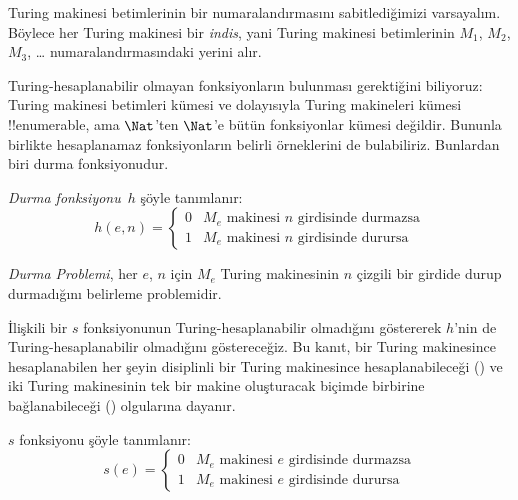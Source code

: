 \documentclass[../../../include/open-logic-section]{subfiles}
\begin{document}

\begin{explain}
Turing makinesi betimlerinin bir numaralandırmasını sabitlediğimizi
varsayalım. Böylece her Turing makinesi bir \emph{indis}, yani Turing
makinesi betimlerinin $M_1$, $M_2$, $M_3$, \dots{} numaralandırmasındaki
yerini alır.

Turing-hesaplanabilir olmayan fonksiyonların bulunması gerektiğini biliyoruz:
Turing makinesi betimleri kümesi ve dolayısıyla Turing makineleri kümesi
!!{enumerable}, ama $\Nat$'ten $\Nat$'e bütün fonksiyonlar kümesi değildir.
Bununla birlikte hesaplanamaz fonksiyonların belirli örneklerini de
bulabiliriz. Bunlardan biri durma fonksiyonudur.
\end{explain}

\begin{defn}
 \emph{Durma fonksiyonu}~$h$ şöyle tanımlanır:
\[
h(e,n) =
\begin{cases}
  \text{0} & \text{$M_e$ makinesi $n$ girdisinde durmazsa} \\
  \text{1} & \text{$M_e$ makinesi $n$ girdisinde durursa}
\end{cases}
\]
\end{defn}

\begin{defn}
\emph{Durma Problemi}, her $e$, $n$ için $M_e$ Turing makinesinin $n$ çizgili
bir girdide durup durmadığını belirleme problemidir.
\end{defn}

\begin{explain}
İlişkili bir $s$ fonksiyonunun Turing-hesaplanabilir olmadığını göstererek
$h$'nin de Turing-hesaplanabilir olmadığını göstereceğiz. Bu kanıt, bir
Turing makinesince hesaplanabilen her şeyin disiplinli bir Turing makinesince
hesaplanabileceği () ve iki Turing makinesinin tek bir
makine oluşturacak biçimde birbirine bağlanabileceği
() olgularına dayanır.
\end{explain}

\begin{defn} $s$ fonksiyonu şöyle tanımlanır:
\[
s(e) =
\begin{cases}
  \text{0} & \text{$M_e$ makinesi $e$ girdisinde durmazsa} \\
  \text{1} & \text{$M_e$ makinesi $e$ girdisinde durursa}
\end{cases}
\]
\end{defn}
\end{document}
